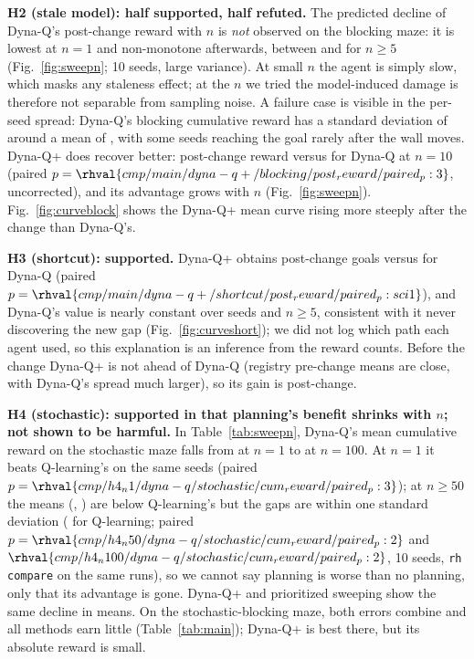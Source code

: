 \textbf{H2 (stale model): half supported, half refuted.} The predicted decline of Dyna-Q's post-change reward with $n$ is \emph{not} observed on the blocking maze: it is lowest at $n=1$ and non-monotone afterwards, between  and  for $n\ge5$ (Fig.~\ref{fig:sweepn}; 10 seeds, large variance). At small $n$ the agent is simply slow, which masks any staleness effect; at the $n$ we tried the model-induced damage is therefore not separable from sampling noise. A failure case is visible in the per-seed spread: Dyna-Q's blocking cumulative reward has a standard deviation of  around a mean of , with some seeds reaching the goal rarely after the wall moves. Dyna-Q+ does recover better: post-change reward  versus  for Dyna-Q at $n=10$ (paired $p=\rhval{cmp/main/dyna-q+/blocking/post_reward/paired_p:3}$, uncorrected), and its advantage grows with $n$ (Fig.~\ref{fig:sweepn}). Fig.~\ref{fig:curveblock} shows the Dyna-Q+ mean curve rising more steeply after the change than Dyna-Q's.

\textbf{H3 (shortcut): supported.} Dyna-Q+ obtains  post-change goals versus  for Dyna-Q (paired $p=\rhval{cmp/main/dyna-q+/shortcut/post_reward/paired_p:sci1}$), and Dyna-Q's value is nearly constant over seeds and $n\ge5$, consistent with it never discovering the new gap (Fig.~\ref{fig:curveshort}); we did not log which path each agent used, so this explanation is an inference from the reward counts. Before the change Dyna-Q+ is not ahead of Dyna-Q (registry pre-change means are close, with Dyna-Q's spread much larger), so its gain is post-change.

\textbf{H4 (stochastic): supported in that planning's benefit shrinks with $n$; not shown to be harmful.} In Table~\ref{tab:sweepn}, Dyna-Q's mean cumulative reward on the stochastic maze falls from  at $n=1$ to  at $n=100$. At $n=1$ it beats Q-learning's  on the same seeds (paired $p=\rhval{cmp/h4_n1/dyna-q/stochastic/cum_reward/paired_p:3}$); at $n\ge50$ the means (, ) are below Q-learning's but the gaps are within one standard deviation ( for Q-learning; paired $p=\rhval{cmp/h4_n50/dyna-q/stochastic/cum_reward/paired_p:2}$ and $\rhval{cmp/h4_n100/dyna-q/stochastic/cum_reward/paired_p:2}$, 10 seeds, \texttt{rh compare} on the same runs), so we cannot say planning is worse than no planning, only that its advantage is gone. Dyna-Q+ and prioritized sweeping show the same decline in means. On the stochastic-blocking maze, both errors combine and all methods earn little (Table~\ref{tab:main}); Dyna-Q+ is best there, but its absolute reward is small.


